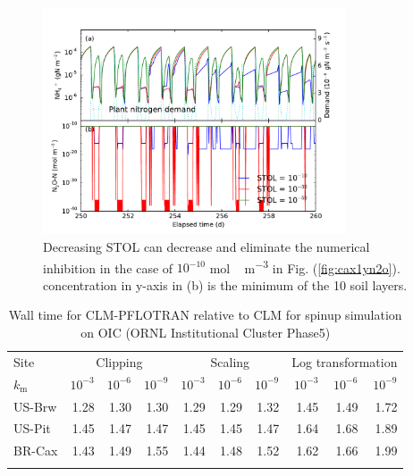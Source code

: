 \documentclass[gmd, manuscript]{copernicus}
\begin{document}
\begin{figure}[t]
\includegraphics[width=0.8\textwidth]{../figs/fig19/cax1yn2ostol0.pdf}
\caption{Decreasing STOL can decrease and eliminate the numerical inhibition in the case of $10^{-10}$  \unit{mol\,m^{-3}}  in Fig. (\ref{fig:cax1yn2o}).  concentration in y-axis in (b) is the minimum of the 10 soil layers.}
\label{fig:cax1yn2osto0}
\end{figure}

\clearpage

\begin{table}[t]
\caption{Wall time for CLM-PFLOTRAN relative to CLM for spinup simulation on OIC (ORNL Institutional Cluster Phase5)}
\label{tab:computingtime}
\begin{tabular}{lrrrrrrrrr}
\tophline
Site & \multicolumn{3}{c}{Clipping}  & \multicolumn{3}{c}{Scaling} & \multicolumn{3}{c}{Log transformation} \\
\middlehline
$k_\text{m}$ & $10^{-3}$ & $10^{-6}$ & $10^{-9}$ &  $10^{-3}$ & $10^{-6}$ & $10^{-9}$ & $10^{-3}$ & $10^{-6}$ & $10^{-9}$\\
\middlehline
US-Brw & 1.28	& 1.30 &	1.30	& 1.29	& 1.29	& 1.32	& 1.45	& 1.49	& 1.72 \\
US-Pit   & 1.45	& 1.47 &	1.47	& 1.45	& 1.45	& 1.47	& 1.64	& 1.68	& 1.89 \\
BR-Cax & 1.43	& 1.49 &	1.55	& 1.44	& 1.48	& 1.52	& 1.62	& 1.66	& 1.99 \\
\bottomhline
\end{tabular}
\end{table}


\clearpage
\end{document}
